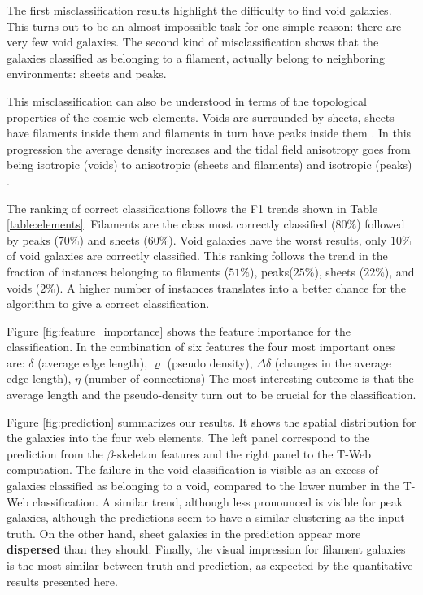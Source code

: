 \documentclass[usenatbib]{mnras}
\begin{document}
The first misclassification results highlight the difficulty to find void galaxies.
This turns out to be an almost impossible task for one simple reason:
there are very few void galaxies.
The second kind of misclassification shows that the galaxies
classified as belonging to a filament, actually belong to neighboring
environments: sheets and peaks.

This misclassification can also be understood in terms of the
topological properties of the cosmic web elements. 
Voids are surrounded by sheets, sheets have filaments inside them and
filaments in turn have peaks inside them \citep{Cautun2014}. 
In this progression the average density increases and the tidal field
anisotropy goes from being isotropic (voids) to anisotropic (sheets
and filaments) and isotropic (peaks) \citep{2015MNRAS.453..497B}.

The ranking of correct classifications follows the F1 trends
shown in Table \ref{table:elements}.
Filaments are the class most correctly classified ($80\%$) followed by
peaks ($70\%$) and sheets ($60\%$).
Void galaxies have the worst results, only $10\%$ of void galaxies are
correctly classified.
This ranking follows the trend in the fraction of instances belonging to
filaments ($51\%$), peaks($25\%$), sheets ($22\%$), and voids ($2\%$).
A higher number of instances translates into a better chance for the
algorithm to give a correct classification. 

Figure \ref{fig:feature_importance} shows the feature
importance for the classification.
In the combination of six features the four most important ones are:
$\delta$ (average edge
length), $\varrho$ (pseudo density), $\Delta \delta$ (changes in the average edge length), $\eta$ (number of connections) 
The most interesting outcome is that the average length and the pseudo-density turn out to be crucial for the classification.

Figure \ref{fig:prediction} summarizes our results.
It shows the spatial distribution for the galaxies into the four web
elements. 
The left panel correspond to the prediction from the
$\beta$-skeleton features and the right panel to the T-Web
computation.
The failure in the void classification is visible as an excess of
galaxies classified as belonging to a void, compared to the lower
number in the T-Web classification.
A similar trend, although less pronounced is visible for peak
galaxies, although the predictions seem to have a similar clustering
as the input truth. 
On the other hand, sheet galaxies in the prediction appear more
\textbf{dispersed} than they should.
Finally, the visual impression for filament galaxies is the most
similar between truth and prediction, as expected by the quantitative
results presented here.
\end{document}
